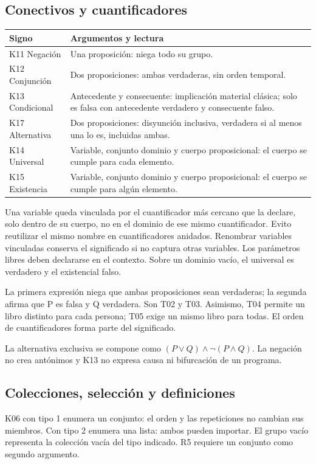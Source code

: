 \subsection{Conectivos y cuantificadores}
\begin{longtable}{@{}p{31mm}>{\raggedright\arraybackslash}p{\dimexpr\linewidth-31mm-2\tabcolsep\relax}@{}}
\toprule Signo & Argumentos y lectura \\ \midrule\endhead
K11 Negación & Una proposición: niega todo su grupo. \\[4pt]
K12 Conjunción & Dos proposiciones: ambas verdaderas, sin orden temporal. \\[4pt]
K13 Condicional & Antecedente y consecuente: implicación material clásica;
solo es falsa con antecedente verdadero y consecuente falso. \\[4pt]
K17 Alternativa & Dos proposiciones: disyunción inclusiva, verdadera si
al menos una lo es, incluidas ambas. \\[4pt]
K14 Universal & Variable, conjunto dominio y cuerpo proposicional:
el cuerpo se cumple para cada elemento. \\[4pt]
K15 Existencia & Variable, conjunto dominio y cuerpo proposicional:
el cuerpo se cumple para algún elemento. \\[4pt]
\bottomrule
\end{longtable}
Una variable queda vinculada por el cuantificador más cercano que la declare,
solo dentro de su cuerpo, no en el dominio de ese mismo cuantificador.
Evito reutilizar el mismo nombre en cuantificadores anidados. Renombrar variables
vinculadas conserva el significado si no captura otras variables. Los parámetros
libres deben declararse en el contexto. Sobre un dominio vacío, el universal
es verdadero y el existencial falso.

La primera expresión niega que ambas proposiciones sean verdaderas; la segunda
afirma que P es falsa y Q verdadera. Son T02 y T03. Asimismo, T04 permite un
libro distinto para cada persona; T05 exige un mismo libro para todas. El orden
de cuantificadores forma parte del significado.

La alternativa exclusiva se compone como
\((P\lor Q)\land\neg(P\land Q)\). La negación no crea antónimos y K13 no
expresa causa ni bifurcación de un programa.

\subsection{Colecciones, selección y definiciones}
K06 con tipo 1 enumera un conjunto: el orden y las repeticiones no cambian sus
miembros. Con tipo 2 enumera una lista: ambos pueden importar. El grupo vacío
representa la colección vacía del tipo indicado. R5 requiere un conjunto como
segundo argumento.

